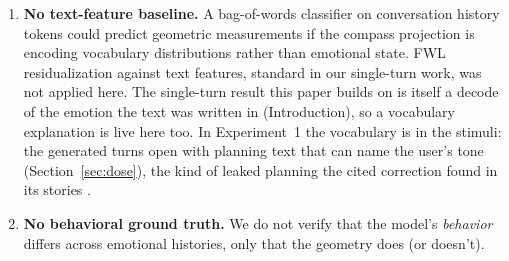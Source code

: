 \documentclass[11pt,a4paper]{article}
\begin{document}
\begin{enumerate}[nosep]
          (1 of the 5 behind calm's class mean), which feeds valence and
          anxious--calm; one contemplative, which feeds anxious--calm; and
          one furious, which feeds valence. That is 2 of valence's 80, 2 of
          anxious--calm's 45 and none of excited--gloomy's 15 by that pattern, and 4, 3 and none by the broader post-data pattern in its \texttt{leak\_split.py} (141 matches over the whole file) (\texttt{code/\allowbreak{}r4\_calibration\_leak\_check.py}; \texttt{code/\allowbreak{}r5\_review\_checks.py}; \texttt{code/\allowbreak{}r6\_review\_checks.py}).
    \item \label{lim:textbaseline}\textbf{No text-feature baseline.} A bag-of-words classifier
          on conversation history tokens could predict geometric
          measurements if the compass projection is encoding vocabulary
          distributions rather than emotional state. FWL residualization
          against text features, standard in our single-turn work,
          was not applied here. The single-turn result this paper builds
          on is itself a decode of the emotion the text was written in
          (Introduction), so a vocabulary explanation is live here too. In
          Experiment~1 the vocabulary is in the stimuli: the generated turns
          open with planning text that can name the user's tone
          (Section~\ref{sec:dose}), the kind of leaked planning the cited
          correction found in its stories \citep{lyra2026usermodel}.
    \item \label{lim:behavior}\textbf{No behavioral ground truth.} We do not verify that
          the model's \emph{behavior} differs across emotional histories,
          only that the geometry does (or doesn't).

\end{enumerate}
\end{document}
